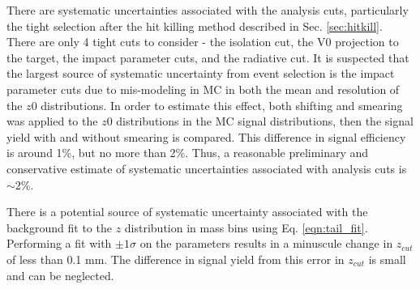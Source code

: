 
There are systematic uncertainties associated with the analysis cuts, particularly the tight selection after the hit killing method described in Sec. \ref{sec:hitkill}. There are only 4 tight cuts to consider - the isolation cut, the V0 projection to the target, the impact parameter cuts, and the radiative cut. It is suspected that the largest source of systematic uncertainty from event selection is the impact parameter cuts due to mis-modeling in MC in both the mean and resolution of the $z0$ distributions. In order to estimate this effect, both shifting and smearing was applied to the $z0$ distributions in the MC signal distributions, then the signal yield with and without smearing is compared. This difference in signal efficiency is around 1\%, but no more than 2\%. Thus, a reasonable preliminary and conservative estimate of systematic uncertainties associated with analysis cuts is $\sim 2$\%.


There is a potential source of systematic uncertainty associated with the background fit to the $z$ distribution in mass bins using Eq. \ref{eqn:tail_fit}. Performing a fit with $\pm 1\sigma$ on the parameters results in a minuscule change in $z_{cut}$ of less than 0.1 mm. The difference in signal yield from this error in $z_{cut}$ is small and can be neglected.

